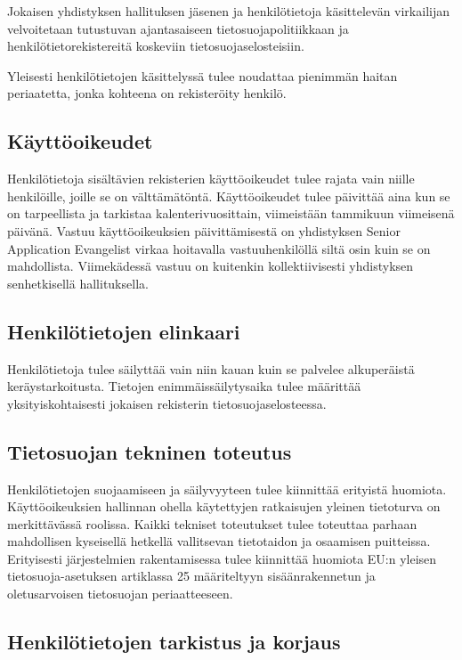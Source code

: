 \documentclass[finnish]{tktltiki}
\begin{document}
Jokaisen yhdistyksen hallituksen jäsenen ja henkilötietoja käsittelevän virkailijan velvoitetaan tutustuvan ajantasaiseen tietosuojapolitiikkaan ja henkilötietorekistereitä koskeviin tietosuojaselosteisiin.

Yleisesti henkilötietojen käsittelyssä tulee noudattaa pienimmän haitan periaatetta, jonka kohteena on rekisteröity henkilö.


\subsection*{Käyttöoikeudet}

Henkilötietoja sisältävien rekisterien käyttöoikeudet tulee rajata vain niille henkilöille, joille se on välttämätöntä. Käyttöoikeudet tulee päivittää aina kun se on tarpeellista ja tarkistaa kalenterivuosittain, viimeistään tammikuun viimeisenä päivänä. Vastuu käyttöoikeuksien päivittämisestä on yhdistyksen Senior Application Evangelist virkaa hoitavalla vastuuhenkilöllä siltä osin kuin se on mahdollista. Viimekädessä vastuu on kuitenkin kollektiivisesti yhdistyksen senhetkisellä hallituksella.


\subsection*{Henkilötietojen elinkaari}

Henkilötietoja tulee säilyttää vain niin kauan kuin se palvelee alkuperäistä keräystarkoitusta. Tietojen enimmäissäilytysaika tulee määrittää yksityiskohtaisesti jokaisen rekisterin tietosuojaselosteessa.


\subsection*{Tietosuojan tekninen toteutus}

Henkilötietojen suojaamiseen ja säilyvyyteen tulee kiinnittää erityistä huomiota. Käyttöoikeuksien hallinnan ohella käytettyjen ratkaisujen yleinen tietoturva on merkittävässä roolissa. Kaikki tekniset toteutukset tulee toteuttaa parhaan mahdollisen kyseisellä hetkellä vallitsevan tietotaidon ja osaamisen puitteissa. Erityisesti järjestelmien rakentamisessa tulee kiinnittää huomiota EU:n yleisen tietosuoja-asetuksen artiklassa 25 määriteltyyn sisäänrakennetun ja oletusarvoisen tietosuojan periaatteeseen.


\subsection*{Henkilötietojen tarkistus ja korjaus}
\end{document}
